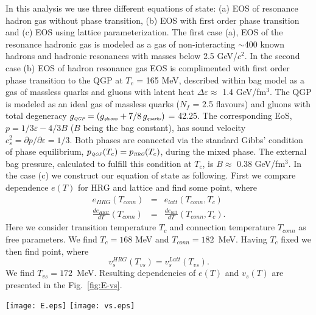 \documentclass[aps,twocolumn,groupedaddress,superscriptaddress,floatfix]{revtex4}
\begin{document}
In this analysis we use three different equations of state: (a)
EOS of resonance hadron gas without phase transition, (b) EOS with
first order phase transition and (c) EOS using lattice
parameterization. The first case (a), EOS of the resonance
hadronic gas is modeled as a gas of non-interacting $\sim$400
known hadrons and hadronic resonances with masses below 2.5
GeV/$c^2$. In the second case (b) EOS of hadron resonance gas EOS
is complimented with first order phase transition to the QGP at
$T_{c}$ = 165 MeV, described within bag model as a gas of massless
quarks and gluons with latent heat $\Delta\varepsilon\approx$ 1.4
GeV/fm$^3$. The QGP is modeled as an ideal gas of massless quarks
($N_f$ = 2.5 flavours) and gluons with total degeneracy
$g_{\mbox{\tiny{\it{QGP}}}} = (g_{\mbox{\tiny{\it{gluons}}}}+7/8\,
g_{\mbox{\tiny{\it{quarks}}}})$ = 42.25. The corresponding EoS,
$p=1/3\varepsilon-4/3B$ ($B$ being the bag constant), has sound
velocity $c_s^2=\partial p/\partial \varepsilon = 1/3$. Both
phases are connected via the standard Gibbs' condition of phase
equilibrium, $p_{\mbox{\tiny{\it{QGP}}}}(T_{c}) =
p_{\mbox{\tiny{\it{HRG}}}}(T_{c})$, during the mixed phase. The
external bag pressure, calculated to fulfill this condition at
$T_c$, is $B\approx$ 0.38 GeV/fm$^3$. In the case (c) we construct
our equation of state as following. First we compare dependence
$e(T)$ for HRG and lattice and find some point, where
\begin{eqnarray}\label{Conn}
 e_{HRG}(T_{conn})&=&e_{latt}(T_{conn},T_c)  \\
 \frac{
 de_{HRG}}{dT}(T_{conn})&=&\frac{de_{latt}}{dT}(T_{conn},T_c).
\end{eqnarray}
Here we consider transition temperature $T_c$ and connection
temperature $T_{conn}$ as free parameters. We find $T_c=168$ MeV
and $T_{conn}=182$~MeV. Having $T_c$ fixed we then find point,
where \begin{equation}\label{vs-conn}
 v_s^{HRG}(T_{vs})=v_s^{Latt}(T_{vs}). \nonumber
\end{equation}
We find $T_{vs}=172$~MeV. Resulting dependencies of $e(T)$ and
$v_s(T)$ are presented in the Fig.~\ref{fig:E-vs}.


\begin{figure*}[tbh]
\texttt{[image: E.eps]}
\texttt{[image: vs.eps]}
\caption{Normalized energy density (left) and speed of sound
(right) for equations of states. Black line represents equation of
state of chemically equilibrated resonance hadron
gas.}\label{fig:E-vs}
\end{figure*}
\end{document}
